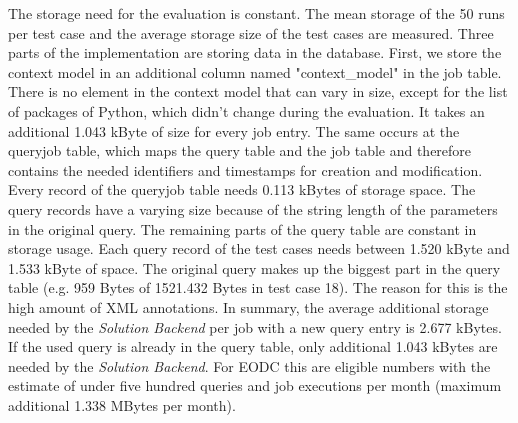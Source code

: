 \documentclass[draft,final]{vutinfth} %
\newcommand{\bgoesswein}[1]{{\color{blue}#1}}
\begin{document}
The storage need for the evaluation is constant. The mean storage of the 50 runs per test case and the average storage size of the test cases are measured. Three parts of the implementation are storing data in the database. First, we store the context model in an additional column named "context\_model" in the job table. There is no element in the context model that can vary in size, except for the list of packages of Python, which didn't change during the evaluation. It takes an additional 1.043 kByte of size for every job entry. The same occurs at the queryjob table, which maps the query table and the job table and therefore contains the needed identifiers and timestamps for creation and modification. Every record of the queryjob table needs 0.113 kBytes of storage space.
The query records have a varying size because of the string length of the parameters in the original query. The remaining parts of the query table are constant in storage usage. Each query record of the test cases needs between 1.520 kByte and 1.533 kByte of space. The original query makes up the biggest part in the query table (e.g. 959 Bytes of 1521.432 Bytes in test case 18). The reason for this is the high amount of XML annotations. In summary, the average additional storage needed by the \textit{Solution Backend} per job with a new query entry is 2.677 kBytes. If the used query is already in the query table, only additional 1.043 kBytes are needed by the \textit{Solution Backend}. \bgoesswein{For EODC this are eligible numbers with the estimate of under five hundred queries and job executions per month (maximum additional 1.338 MBytes per month).}
\newpage
\end{document}
